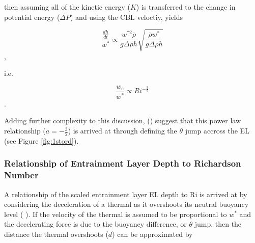 then assuming all of the kinetic energy ($K$) is transferred to the change in potential energy ($\Delta P$) and
using the \acs{CBL} veloctiy, yields




\begin{equation}
\frac{\frac{dh}{dt}}{w^{*}} \propto \frac{w^{*2} \overline{\rho}}{g \Delta \rho h} \sqrt{\frac{\overline{\rho} w^{*}}{g \Delta \rho h}}
\end{equation},

i.e.

\begin{equation}
\frac{w_{e}}{w^{*}} \propto Ri^{-\frac{3}{2}}
\end{equation}.

Adding further complexity to this discussion, \citeauthor{FedConzMir04} (\citeyear{FedConzMir04}) suggest that this power law relationship ($a = -\frac{3}{2}$) is arrived at through defining the $\theta$ jump accross the \acs{EL} (see Figure \ref{fig:1stord}).\\

\subsubsection{Relationship of Entrainment Layer Depth to Richardson Number}

A relationship of the scaled entrainment layer \acs{EL} depth to \acs{Ri} is arrived at by considering the deceleration of a thermal
as it overshoots its neutral buoyancy level (\citeauthor{StullNelEl} \citeyear{StullNelEl}).  If the velocity of the thermal is assumed to be
proportional to $w^{*}$ and the decelerating force is due to the buoyancy difference, or $\theta$ jump, then the distance the thermal overshoots
($d$) can be approximated by

